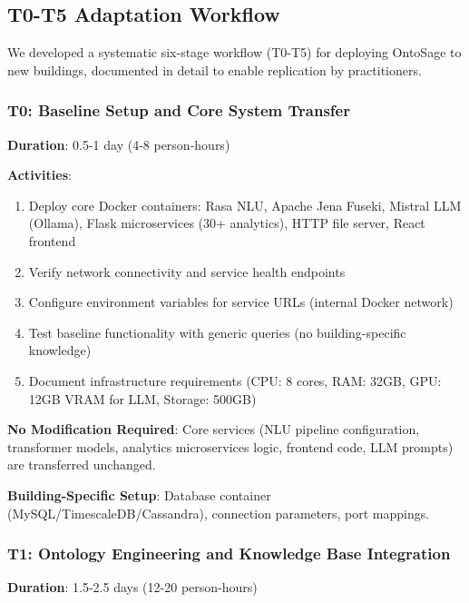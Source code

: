 \documentclass[acmlarge]{acmart}
\begin{document}
\subsection{T0-T5 Adaptation Workflow}

We developed a systematic six-stage workflow (T0-T5) for deploying OntoSage to new buildings, documented in detail to enable replication by practitioners.

\subsubsection{T0: Baseline Setup and Core System Transfer}

\textbf{Duration}: 0.5-1 day (4-8 person-hours)

\textbf{Activities}:
\begin{enumerate}
    \item Deploy core Docker containers: Rasa NLU, Apache Jena Fuseki, Mistral LLM (Ollama), Flask microservices (30+ analytics), HTTP file server, React frontend
    \item Verify network connectivity and service health endpoints
    \item Configure environment variables for service URLs (internal Docker network)
    \item Test baseline functionality with generic queries (no building-specific knowledge)
    \item Document infrastructure requirements (CPU: 8 cores, RAM: 32GB, GPU: 12GB VRAM for LLM, Storage: 500GB)
\end{enumerate}

\textbf{No Modification Required}: Core services (NLU pipeline configuration, transformer models, analytics microservices logic, frontend code, LLM prompts) are transferred unchanged.

\textbf{Building-Specific Setup}: Database container (MySQL/TimescaleDB/Cassandra), connection parameters, port mappings.

\subsubsection{T1: Ontology Engineering and Knowledge Base Integration}

\textbf{Duration}: 1.5-2.5 days (12-20 person-hours)
\end{document}
